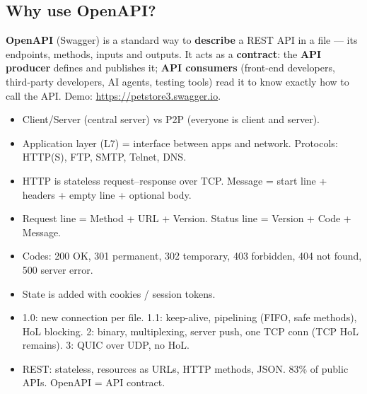\subsection{Why use OpenAPI?}
\textbf{OpenAPI} (Swagger) is a standard way to \textbf{describe} a REST API in a file --- its endpoints, methods, inputs and outputs. It acts as a \textbf{contract}: the \textbf{API producer} defines and publishes it; \textbf{API consumers} (front-end developers, third-party developers, AI agents, testing tools) read it to know exactly how to call the API. Demo: \url{https://petstore3.swagger.io}.

\begin{recap}
\begin{itemize}
  \item Client/Server (central server) vs P2P (everyone is client and server).
  \item Application layer (L7) = interface between apps and network. Protocols: HTTP(S), FTP, SMTP, Telnet, DNS.
  \item HTTP is stateless request--response over TCP. Message = start line + headers + empty line + optional body.
  \item Request line = Method + URL + Version. Status line = Version + Code + Message.
  \item Codes: 200 OK, 301 permanent, 302 temporary, 403 forbidden, 404 not found, 500 server error.
  \item State is added with cookies / session tokens.
  \item 1.0: new connection per file. 1.1: keep-alive, pipelining (FIFO, safe methods), HoL blocking. 2: binary, multiplexing, server push, one TCP conn (TCP HoL remains). 3: QUIC over UDP, no HoL.
  \item REST: stateless, resources as URLs, HTTP methods, JSON. 83\% of public APIs. OpenAPI = API contract.
\end{itemize}
\end{recap}

